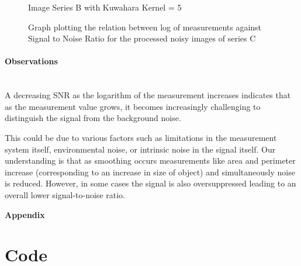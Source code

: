 \documentclass[runningheads]{llncs}
\begin{document}
\begin{figure}[h!]
\begin{minipage}[h]{0.47\linewidth}
\begin{center}
\caption{Image Series B with Kuwahara Kernel = 5}
\label{SeriesC_Log_Kuwahara_5}
\end{center}
\end{minipage}
\caption*{ Graph plotting the relation between log of measurements against Signal to Noise Ratio for the processed noisy images of series C}
\label{SeriesC_Log_SNR}
\end{figure}
\paragraph*{\textbf{Observations}}
~\\ A decreasing SNR as the logarithm of the measurement increases indicates that as the measurement value grows, it becomes increasingly challenging to distinguish the signal from the background noise.
\par This could be due to various factors such as limitations in the measurement system itself, environmental noise, or intrinsic noise in the signal itself. Our understanding is that as smoothing occurs measurements like area and perimeter increase (corresponding to an increase in size of object) and simultaneously noise is reduced. However, in some cases the signal is also oversuppressed leading to an overall lower signal-to-noise ratio.

\newpage
\appendix
\textbf{Appendix}
\section{Code}
%   

%
%
\end{document}
